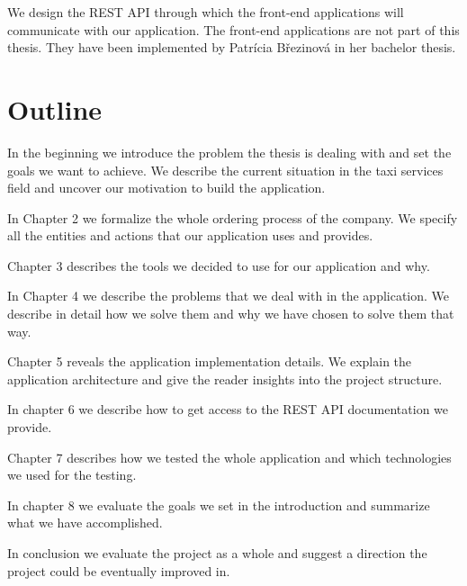 We design the REST API through which the front-end applications will communicate with our application. The front-end applications are not part of this thesis. They have been implemented by Patrícia Březinová in her bachelor thesis.


\section{Outline}
In the beginning we introduce the problem the thesis is dealing with and set the goals we want to achieve. We describe the current situation in the taxi services field and uncover our motivation to build the application. 

In Chapter 2 we formalize the whole ordering process of the company. We specify all the entities and actions that our application uses and provides.

Chapter 3 describes the tools we decided to use for our application and why.

In Chapter 4 we describe the problems that we deal with in the application. We describe in detail how we solve them and why we have chosen to solve them that way.  

Chapter 5 reveals the application implementation details. We explain the application architecture and give the reader insights into the project structure.

In chapter 6 we describe how to get access to the REST API documentation we provide.

Chapter 7 describes how we tested the whole application and which technologies we used for the testing.

In chapter 8 we evaluate the goals we set in the introduction and summarize what we have accomplished.

In conclusion we evaluate the project as a whole and suggest a direction the project could be eventually improved in. 
